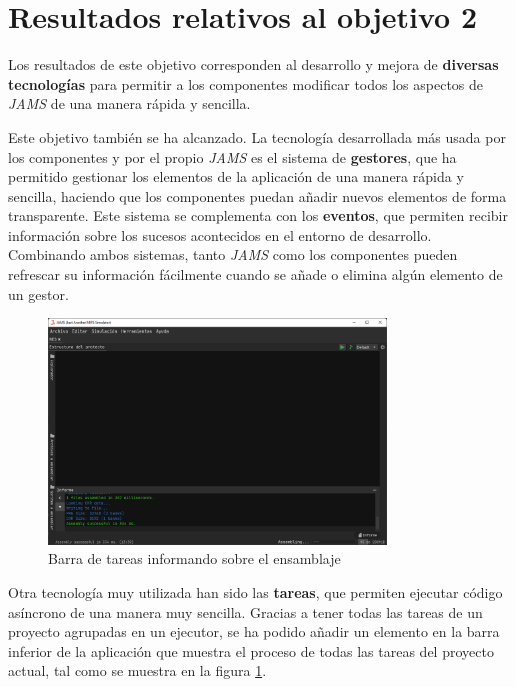 \section{Resultados relativos al objetivo 2}\label{sec:resultados-relativos-al-objetivo-2}

Los resultados de este objetivo corresponden al desarrollo y mejora de
\textbf{diversas tecnologías} para permitir a los componentes modificar
todos los aspectos de \textit{JAMS} de una manera rápida y sencilla.

Este objetivo también se ha alcanzado.
La tecnología desarrollada más usada por los componentes
y por el propio \textit{JAMS} es el sistema de \textbf{gestores},
que ha permitido gestionar los elementos de la aplicación
de una manera rápida y sencilla, haciendo que los componentes
puedan añadir nuevos elementos de forma transparente.
Este sistema se complementa con los \textbf{eventos},
que permiten recibir información sobre los sucesos
acontecidos en el entorno de desarrollo.
Combinando ambos sistemas, tanto \textit{JAMS} como los componentes
pueden refrescar su información fácilmente cuando se añade o elimina
algún elemento de un gestor.

\begin{figure}[h]
    \centering
    \includegraphics[width=0.8\textwidth]{images/results/jams-tasks}
    \caption{Barra de tareas informando sobre el ensamblaje}
    \label{fig:jams-tasks}
\end{figure}

Otra tecnología muy utilizada han sido las \textbf{tareas},
que permiten ejecutar código asíncrono de una manera muy
sencilla.
Gracias a tener todas las tareas de un proyecto agrupadas
en un ejecutor, se ha podido añadir
un elemento en la barra inferior de la aplicación que muestra
el proceso de todas las tareas del proyecto actual,
tal como se muestra en la figura \ref{fig:jams-tasks}.


